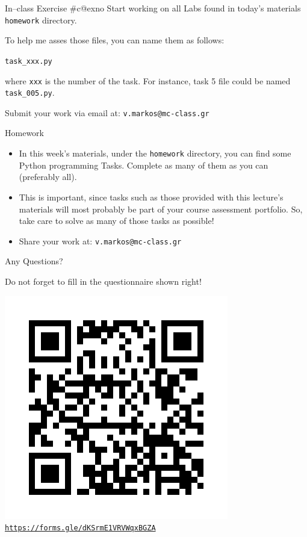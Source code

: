 \documentclass[aspectratio=169, 12pt, xcolor=table]{beamer}
\makeatletter
\newcommand{\ohref}[1]{\href{#1}{\texttt{#1}}}
\newcommand{\arabicthree}[1]{\expandafter\@arabicthree\csname c@#1\endcsname}
\newcommand{\@arabicthree}[1]{\ifnum #1<100 0\fi\ifnum #1<10 0\fi\number#1}
\newcounter{exno}
\newcommand{\exno}{\stepcounter{exno}In--class Exercise \#\arabicthree{exno}}
\makeatother
\begin{document}
	\begin{frame}{\exno}
		Start working on all Labs found in today's materials \texttt{homework} directory.
		
		To help me asses those files, you can name them as follows:
		\begin{center}
			\texttt{task\_xxx.py}
		\end{center}
		where \texttt{xxx} is the number of the task. For instance, task 5 file could be named \texttt{task\_005.py}.
		
		Submit your work via email at: \texttt{v.markos@mc-class.gr}
	\end{frame}

	\begin{frame}{Homework}
		\begin{itemize}
			\item In this week's materials, under the \texttt{homework} directory, you can find some Python programming Tasks. Complete as many of them as you can (preferably all).
			\item This is important, since tasks such as those provided with this lecture's materials will most probably be part of your course assessment portfolio. So, take care to solve as many of those tasks as possible!
			\item Share your work at: \texttt{v.markos@mc-class.gr}
		\end{itemize}
	\end{frame}

	\begin{frame}{Any Questions?}
		\begin{minipage}{0.35\textwidth}
			\raggedright
			Do not forget to fill in the questionnaire shown right!
		\end{minipage}\hfill
		\begin{minipage}{0.58\textwidth}
			\vspace{0pt}
			\raggedleft
			\includegraphics[scale=0.4]{../../assets/post_lesson_assessment.png}
			\centering
			\ohref{https://forms.gle/dKSrmE1VRVWqxBGZA}
		\end{minipage}
	\end{frame}
	
\end{document}
